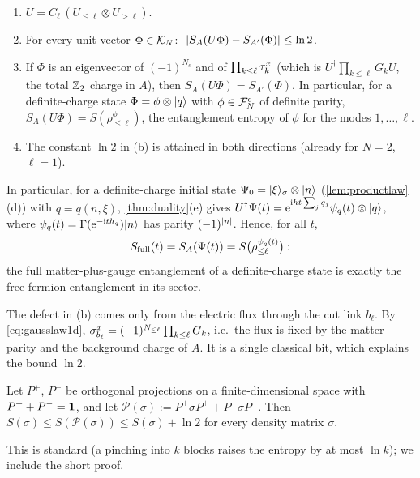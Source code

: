 \begin{lemma}\label{lem:cutlocal}
\leavevmode
\begin{enumerate}[label=(\alph*)]
\item $U=C_\ell\,(U_{\le\ell}\otimes U_{>\ell})$.
\item For every unit vector $\Phi\in\mathcal{K}_N$: $\ \abs{S_A(U\Phi)-S_{A'}(\Phi)}\le\ln2$.
\item If $\Phi$ is an eigenvector of $(-1)^{N_c}$ and of $\prod_{k\le\ell}\tau^{x}_{k}$ (which is
$U^\dagger\prod_{k\le\ell}G_kU$, the total $\mathbb{Z}_2$ charge in $A$), then $S_A(U\Phi)=S_{A'}(\Phi)$.  In
particular, for a definite-charge state $\Phi=\phi\otimes|q\rangle$ with $\phi\in\mathcal{F}_N^c$ of definite
parity, $S_A(U\Phi)=S(\rho^\phi_{\le\ell})$, the entanglement entropy of $\phi$ for the modes
$1,\dots,\ell$.
\item The constant $\ln2$ in (b) is attained in both directions (already for $N=2$, $\ell=1$).
\end{enumerate}
\end{lemma}

In particular, for a definite-charge initial state $\Psi_0=|\xi\rangle_\sigma\otimes|n\rangle$
(\cref{lem:productlaw}(d)) with $q=q(n,\xi)$, \cref{thm:duality}(e) gives
$U^\dagger\Psi(t)=\mathrm{e}^{\mathrm{i} ht\sum_jq_j}\psi_q(t)\otimes|q\rangle$, where $\psi_q(t)=\Gamma(\mathrm{e}^{-\mathrm{i} th_{q}})|n\rangle$
has parity $(-1)^{\left|n\right|}$.  Hence, for all $t$,
\begin{equation}\label{eq:quenchedSfull}
  S_{\mathrm{full}}(t)=S_A(\Psi(t))=S\bigl(\rho^{\psi_q(t)}_{\le\ell}\bigr):
\end{equation}
the full matter-plus-gauge entanglement of a definite-charge state is exactly the free-fermion
entanglement in its sector.

The defect in (b) comes only from the electric flux through the cut link $b_\ell$.  By
\eqref{eq:gausslaw1d}, $\sigma^{x}_{b_{\ell}}=(-1)^{N_{\le\ell}}\prod_{k\le\ell}G_k$, i.e.\ the flux is fixed by
the matter parity and the background charge of $A$.  It is a single classical bit, which explains
the bound $\ln2$.

\begin{lemma}\label{lem:pinching}
Let $P^+$, $P^-$ be orthogonal projections on a finite-dimensional space with $P^++P^-=\mathbf{1}$, and let
$\mathcal{P}(\sigma):=P^+\sigma P^++P^-\sigma P^-$.  Then
$S(\sigma)\le S(\mathcal{P}(\sigma))\le S(\sigma)+\ln2$ for every density matrix $\sigma$.
\end{lemma}

This is standard (a pinching into $k$ blocks raises the entropy by at most $\ln k$); we include the
short proof.


